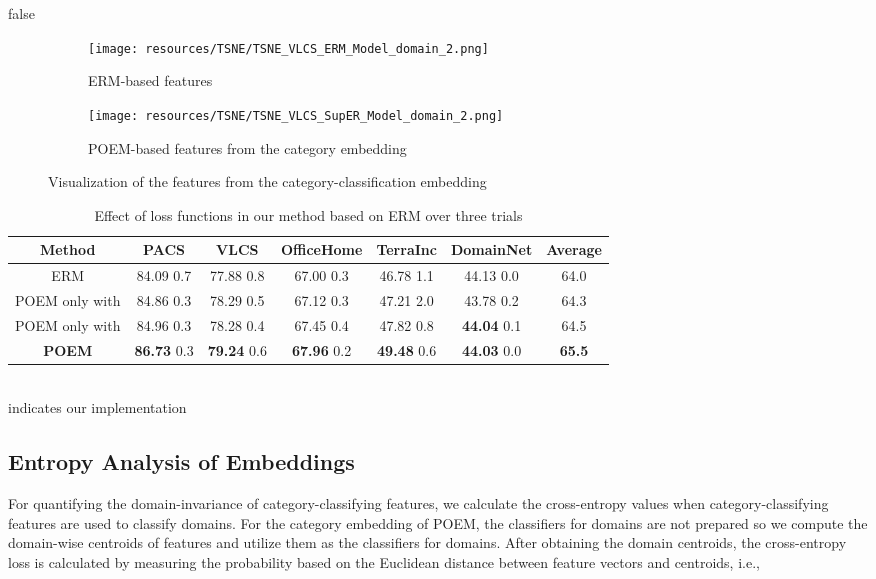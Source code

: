 \documentclass[letterpaper]{article} \usepackage{aaai23}  \usepackage{times}  \usepackage{helvet}  \usepackage{courier}  \usepackage[hyphens]{url}  \usepackage{graphicx} \urlstyle{rm} \def\UrlFont{\rm}  \usepackage{natbib}  \usepackage{caption} \frenchspacing  \setlength{\pdfpagewidth}{8.5in}  \setlength{\pdfpageheight}{11in}  \usepackage[labelsep=period]{caption}
\begin{document}
\if false
\begin{figure*}
	\captionsetup{justification=centering}
	\centering
	\begin{subfigure}[b]{0.4\textwidth}
		\centering
		\texttt{[image: resources/TSNE/TSNE\_VLCS\_ERM\_Model\_domain\_2.png]}
		\caption{ERM-based features}
		\label{fig:tSNE_ERM}
	\end{subfigure}
	\begin{subfigure}[b]{0.4\textwidth}
		\centering
		\texttt{[image: resources/TSNE/TSNE\_VLCS\_SupER\_Model\_domain\_2.png]}
		\caption{POEM-based features from the category embedding}
		\label{fig:tSNE_POEM}
	\end{subfigure}
	\caption{Visualization of the features from the category-classification embedding}
	\label{fig:tSNE}
\end{figure*}
\fi

\begin{table*}[!ht]
\centering
	\begin{tabular}{cccccc|c}
		\toprule
		\textbf{Method} & PACS & VLCS & OfficeHome & TerraInc & DomainNet & Average\\
		\midrule
  		ERM & 84.09  0.7 & 77.88  0.8 & 67.00  0.3 & 46.78  1.1 & 44.13  0.0 & 64.0\\
		POEM only with  & 84.86  0.3 & 78.29  0.5 & 67.12  0.3 & 47.21  2.0 & 43.78  0.2 & 64.3\\
		POEM only with  & 84.96  0.3 & 78.28  0.4 & 67.45  0.4 & 47.82  0.8 & \textbf{44.04}  0.1 & 64.5\\
		\textbf{POEM} & \textbf{86.73}  0.3 & \textbf{79.24}  0.6 & \textbf{67.96}  0.2 & \textbf{49.48}  0.6 & \textbf{44.03}  0.0 & \textbf{65.5}\\
\hline
	\end{tabular}
 \\ \footnotesize{ indicates our implementation}
    \caption{Effect of loss functions in our method based on ERM over three trials}
	\label{tab:ablation}
\end{table*}

\subsection{Entropy Analysis of Embeddings}
For quantifying the domain-invariance of category-classifying features, we calculate the cross-entropy values when category-classifying features are used to classify domains. 
For the category embedding of POEM, the classifiers for domains are not prepared so we compute the domain-wise centroids  of features and utilize them as the classifiers for domains. 
After obtaining the domain centroids, the cross-entropy loss is calculated by measuring the probability based on the Euclidean distance between feature vectors and centroids, i.e.,
\end{document}
